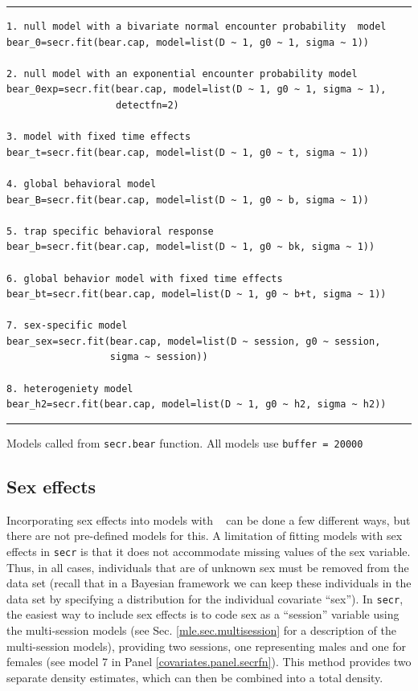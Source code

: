 \begin{panel}[htp]
\centering
\rule[0.1in]{\textwidth}{.03in}
{\small
\begin{verbatim}
1. null model with a bivariate normal encounter probability  model
bear_0=secr.fit(bear.cap, model=list(D ~ 1, g0 ~ 1, sigma ~ 1))

2. null model with an exponential encounter probability model
bear_0exp=secr.fit(bear.cap, model=list(D ~ 1, g0 ~ 1, sigma ~ 1),
                   detectfn=2)

3. model with fixed time effects
bear_t=secr.fit(bear.cap, model=list(D ~ 1, g0 ~ t, sigma ~ 1))

4. global behavioral model
bear_B=secr.fit(bear.cap, model=list(D ~ 1, g0 ~ b, sigma ~ 1))

5. trap specific behavioral response
bear_b=secr.fit(bear.cap, model=list(D ~ 1, g0 ~ bk, sigma ~ 1))

6. global behavior model with fixed time effects
bear_bt=secr.fit(bear.cap, model=list(D ~ 1, g0 ~ b+t, sigma ~ 1))

7. sex-specific model
bear_sex=secr.fit(bear.cap, model=list(D ~ session, g0 ~ session, 
                  sigma ~ session))

8. heterogeniety model
bear_h2=secr.fit(bear.cap, model=list(D ~ 1, g0 ~ h2, sigma ~ h2))
\end{verbatim}
}

\rule[-0.1in]{\textwidth}{.03in}
\caption{
Models called from \mbox{\tt secr.bear} function. All models use \mbox{\tt buffer = 20000}}
\label{covariates.panel.secrfn}
\end{panel}


\subsection{Sex effects}
\label{covariates.secr.sex}

Incorporating sex effects into models with \secr~ can be done a few
different ways, but there are not pre-defined models for this.  A
limitation of fitting models with sex effects in \mbox{\tt secr} is
that it does not accommodate missing values of the sex variable. Thus,
in all cases, individuals that are of unknown sex must be removed from
the data set (recall that in a Bayesian framework we can keep these
individuals in the data set by specifying a distribution for the
individual covariate ``sex'').  In \mbox{\tt secr}, the easiest way to
include sex effects is to code sex as a ``session'' variable using the
multi-session models (see Sec. \ref{mle.sec.multisession} for a
description of the multi-session models), providing two sessions, one
representing males and one for females (see model 7 in Panel
\ref{covariates.panel.secrfn}).  This method provides two separate
density estimates, which can then be combined into a total density.



